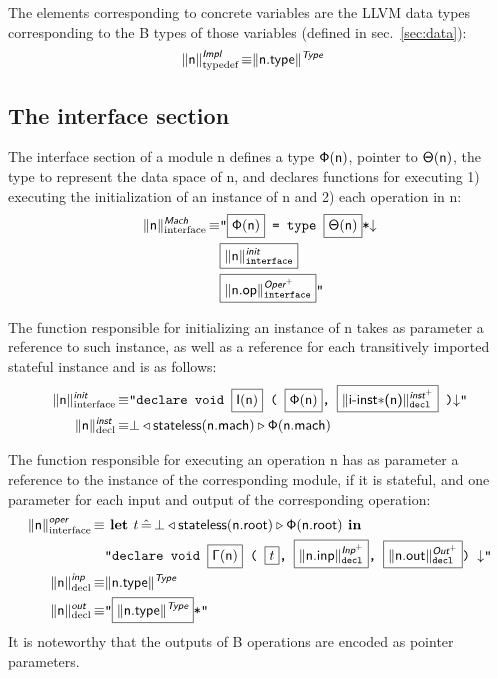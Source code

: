 \documentclass{llncs}
\newcommand{\trad}[2]{\ensuremath{\lVert \textsf{#1} \rVert^{\textit{#2}}}}
\newcommand{\nl}[0]{\ensuremath{\downarrow}}
\DeclareMathOperator{\isdef}{\equiv}
\newcommand{\llvm}[1]{\texttt{#1}}
\newcommand{\B}[1]{\textsf{#1}}
\newcommand{\ListOf}[1]{$\mbox{#1}^+$}
\newcommand{\LET}[0]{\textbf{ let }}
\DeclareMathOperator{\BE}{\hat{=}}
\newcommand{\IN}[0]{\textbf{ in }}
\newcommand{\PH}[1]{\framebox{$#1$}}
\newcommand{\Global}[0]{\ensuremath{\sf\Gamma}}
\newcommand{\stateless}[0]{\ensuremath{\textsf{stateless}}}
\newcommand{\trimportedinstances}[0]{\ensuremath{\textsf{i-inst$\mathsf{\ast}$}}}
\newcommand{\state}[0]{\ensuremath{\sf\Theta}}
\newcommand{\stateref}[0]{\ensuremath{\sf\Phi}}
\newcommand{\init}[0]{\ensuremath{\mathsf{I}}}
\begin{document}
The elements corresponding to concrete variables are the LLVM data types
corresponding to the B types of those variables (defined in
sec.~\ref{sec:data}):
\begin{align*}
  \trad{\B{n}}{\B{Impl}}_{\text{typedef}} \isdef
  & \trad{\B{n.type}}{\B{Type}}
\end{align*}

\subsection{The interface section}

The interface section of a module \B{n} defines a type $\stateref(\B{n})$,
pointer to $\state(\B{n})$, the type to represent the data space of \B{n}, and
declares functions for executing 1) executing the initialization of an instance
of \B{n} and 2) each operation in \B{n}:
\begin{align*}
  \trad{\B{n}}{\B{Mach}}_{\text{interface}} \isdef
  & \llvm{"\PH{\stateref(\B{n})} = type \PH{\state(\B{n})}*\nl} \\
  & \llvm{\PH{\trad{\B{n}}{\B{init}}_{\text{interface}}}}\\
  & \llvm{\PH{\trad{\B{n.op}}{\ListOf{\B{Oper}}}_{\text{interface}}}"}
\end{align*}

The function responsible for initializing an instance of \B{n} takes as
parameter a reference to such instance, as well as a reference for each
transitively imported stateful instance and is as follows:
\begin{align*}
  \trad{\B{n}}{\B{init}}_{\text{interface}} \isdef
  & \llvm{"declare void \PH{\init(\B{n})} ( \PH{\stateref(\B{n})},
    \PH{\trad{\trimportedinstances(\B{n})}{\ListOf{\B{inst}}}_{\text{decl}}} )\nl"} \\
  \trad{\B{n}}{\B{inst}}_{\text{decl}} \isdef
  & \bot \triangleleft \stateless(\B{n.mach}) \triangleright \stateref(\B{n.mach})
\end{align*}

The function responsible for executing an operation \B{n} has as parameter a
reference to the instance of the corresponding module, if it is stateful, and
one parameter for each input and output of the corresponding operation:
\begin{align*}
  \trad{\B{n}}{\B{oper}}_{\text{interface}} \isdef
  &
\LET t \BE \bot \triangleleft \stateless(\B{n.root}) \triangleright \stateref(\B{n.root}) \IN \\
& \llvm{"declare void \PH{\Global(\B{n})}
( \PH{t},
  \PH{\trad{\B{n.inp}}{\ListOf{\B{Inp}}}_{\text{decl}}},
  \PH{\trad{\B{n.out}}{\ListOf{\B{Out}}}_{\text{decl}}}) \nl"} \\
  \trad{\B{n}}{\B{inp}}_{\text{decl}} \isdef & \trad{\B{n.type}}{\B{Type}} \\
  \trad{\B{n}}{\B{out}}_{\text{decl}} \isdef & \llvm{"\PH{\trad{\B{n.type}}{\B{Type}}}*"}
\end{align*}
It is noteworthy that the outputs of B operations are encoded as pointer
parameters.
\end{document}
